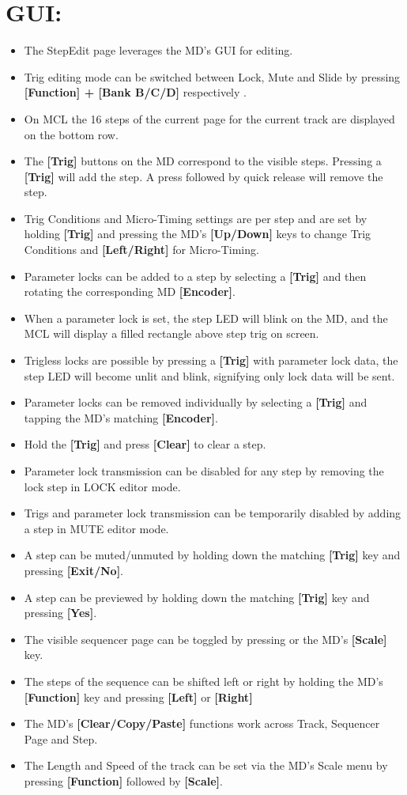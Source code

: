 \section{GUI:}
\begin{itemize}
\item The StepEdit page leverages the MD's GUI for editing.
\item Trig editing mode can be switched between Lock, Mute and Slide by pressing \textbf{[Function] + [Bank B/C/D] }respectively .
\item On MCL the 16 steps of the current page for the current track are displayed on the bottom row.
\item The \textbf{[Trig]} buttons on the MD correspond to the visible steps. Pressing a \textbf{[Trig]} will add the step. A press followed by quick release will remove the step. 
\item Trig Conditions and Micro-Timing settings are per step and are set by holding \textbf{[Trig]} and pressing the MD's \textbf{[Up/Down]} keys to change Trig Conditions and \textbf{[Left/Right]} for Micro-Timing.
\item Parameter locks can be added to a step by selecting a \textbf{[Trig]} and then rotating the corresponding MD \textbf{[Encoder]}.
\item When a parameter lock is set, the step LED will blink on the MD, and the MCL will display a filled rectangle above step trig on screen.
\item Trigless locks are possible by pressing a \textbf{[Trig]} with parameter lock data, the step LED will become unlit and blink, signifying only lock data will be sent.
\item Parameter locks can be removed individually by selecting a \textbf{[Trig]} and tapping the MD's matching \textbf{[Encoder]}. 
\item Hold the \textbf{[Trig]} and press \textbf{[Clear]} to clear a step.
\item Parameter lock transmission can be disabled for any step by removing the lock step in LOCK editor mode.
\item Trigs and parameter lock transmission can be temporarily disabled by adding a step in MUTE editor mode.
\item A step can be muted/unmuted by holding down the matching \textbf{[Trig]} key and pressing \textbf{[Exit/No]}.
\item A step can be previewed by holding down the matching \textbf{[Trig]} key and pressing \textbf{[Yes]}.
\item The visible sequencer page can be toggled by pressing or the MD's \textbf{[Scale]} key.
\item The steps of the sequence can be shifted left or right by holding the MD's \textbf{[Function]} key and pressing \textbf{[Left]} or \textbf{[Right]}
\item The MD's \textbf{[Clear/Copy/Paste]} functions work across Track, Sequencer Page and Step.
\item The Length and Speed of the track can be set via the MD's Scale menu by pressing \textbf{[Function]} followed by \textbf{[Scale]}.

\end{itemize}
\newpage
